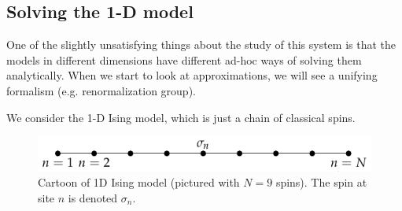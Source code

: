 \subsection{Solving the 1-D model}
One of the slightly unsatisfying things about the study of this system is that the models in different dimensions have different ad-hoc ways of solving them analytically. When we start to look at approximations, we will see a unifying formalism (e.g. renormalization group).

We consider the 1-D Ising model, which is just a chain of classical spins. 

\begin{figure}[htbp]
    \centering
    \includegraphics{Images/fig-1DIsing.pdf}
    \caption{Cartoon of 1D Ising model (pictured with $N = 9$ spins). The spin at site $n$ is denoted $\sigma_n$.}
    \label{fig-1DIsing}
\end{figure}

